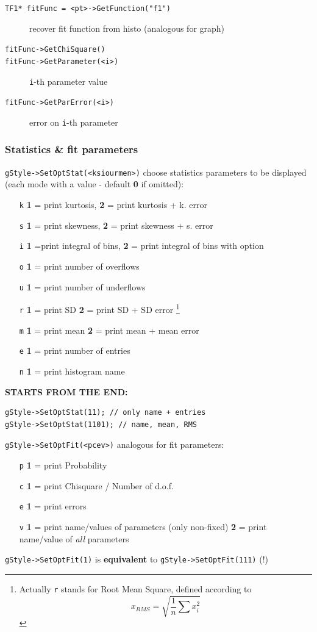 \documentclass[10pt, oneside]{article}
\begin{document}
\begin{description}
\item[\texttt{TF1* fitFunc = <pt>->GetFunction("f1")}] recover fit function from histo (analogous for graph)
\item[\texttt{fitFunc->GetChiSquare()}]
\item[\texttt{fitFunc->GetParameter(<i>)}] \texttt{i}-th parameter value
\item[\texttt{fitFunc->GetParError(<i>)}] error on \texttt{i}-th parameter
\end{description}

\subsubsection{Statistics \& fit parameters}
\texttt{gStyle->SetOptStat(<ksiourmen>)} choose statistics parameters to be displayed \\
(each mode with a value - default \textbf{0} if omitted):
\begin{itemize}
\item[\texttt{k}] \textbf{1} = print kurtosis, \textbf{2} = print kurtosis + k. error
\item[\texttt{s}] \textbf{1} = print skewness, \textbf{2} = print skewness + s. error
\item[\texttt{i}] \textbf{1} =print integral of bins, \textbf{2} = print integral of bins with option 
\item[\texttt{o}] \textbf{1} = print number of overflows
\item[\texttt{u}] \textbf{1} = print number of underflows
\item[\texttt{r}] \textbf{1} = print SD \textbf{2} = print SD + SD error \footnote{Actually \texttt{r} stands for Root Mean Square, defined according to 
\[x_{RMS} = \sqrt{\frac{1}{n} \sum x_i^2}\]
} 
\item[\texttt{m}] \textbf{1} = print mean \textbf{2} = print mean + mean error
\item[\texttt{e}] \textbf{1} = print number of entries
\item[\texttt{n}] \textbf{1} = print histogram name 
\end{itemize}
\textbf{STARTS FROM THE END:} 
\begin{verbatim}
gStyle->SetOptStat(11); // only name + entries
gStyle->SetOptStat(1101); // name, mean, RMS
\end{verbatim}
\texttt{gStyle->SetOptFit(<pcev>)} analogous for fit parameters:
\begin{itemize}
\item[\texttt{p}] \textbf{1} = print Probability
\item[\texttt{c}] \textbf{1} = print Chisquare / Number of d.o.f.
\item[\texttt{e}] \textbf{1} = print errors
\item[\texttt{v}] \textbf{1} = print name/values of parameters (only non-fixed) \textbf{2} = print name/value of \textit{all} parameters
\end{itemize}
\texttt{gStyle->SetOptFit(1)} is \textbf{equivalent} to \texttt{gStyle->SetOptFit(111)} (!)
\end{document}
